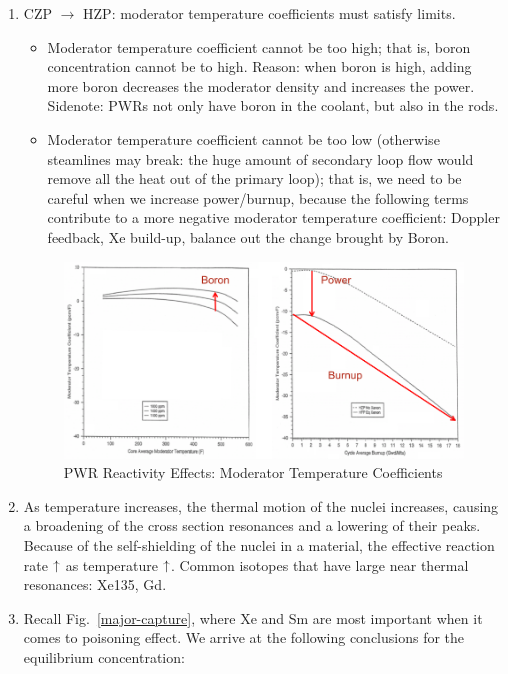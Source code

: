 \documentclass{school-22.211-notes}
\begin{document}
\begin{enumerate}
\item CZP $\to$ HZP: moderator temperature coefficients must satisfy limits.
  \begin{itemize}
  \item Moderator temperature coefficient cannot be too high; that is, boron concentration cannot be to high. Reason: when boron is high, adding more boron decreases the moderator density and increases the power. Sidenote: PWRs not only have boron in the coolant, but also in the rods.
  \item Moderator temperature coefficient cannot be too low (otherwise steamlines may break: the huge amount of secondary loop flow would remove all the heat out of the primary loop); that is, we need to be careful when we increase power/burnup, because the following terms contribute to a more negative moderator temperature coefficient: Doppler feedback, Xe build-up, balance out the change brought by Boron. 
  \end{itemize}
  \begin{figure}[ht]
    \centering
    \includegraphics[width=6.5in]{images/design/moderator-temp-coeff.png}
    \caption{PWR Reactivity Effects: Moderator Temperature Coefficients} \label{PWR-rho}
  \end{figure}

\item {} As temperature increases, the thermal motion of the nuclei increases, causing a broadening of the cross section resonances and a lowering of their peaks. Because of the self-shielding of the nuclei in a material, the effective reaction rate $\uparrow$ as temperature $\uparrow$. Common isotopes that have large near thermal resonances: Xe135, Gd. 

\item {} Recall Fig.~\ref{major-capture}, where Xe and Sm are most important when it comes to poisoning effect. We arrive at the following conclusions for the equilibrium concentration: 


\end{enumerate}
\end{document}
